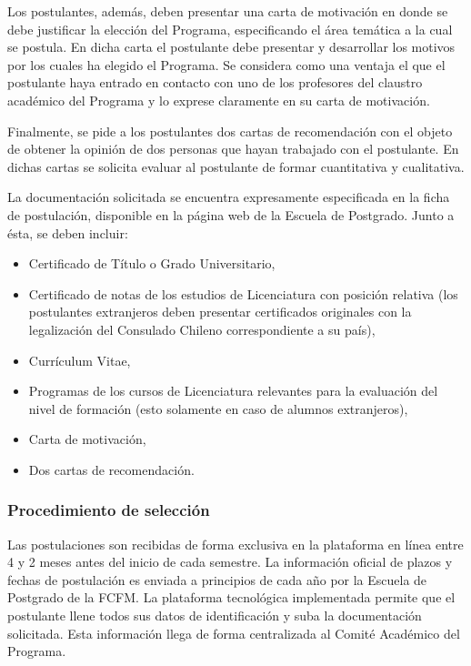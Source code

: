 Los postulantes, además, deben presentar una carta de motivación en donde se debe justificar
la elección del Programa, especificando el área temática a la cual se postula. En dicha carta el
postulante debe presentar y desarrollar los motivos por los cuales ha elegido el Programa. Se
considera como una ventaja el que el postulante haya entrado en contacto con uno de los profesores
del claustro académico del Programa y lo exprese claramente en su carta de motivación.

Finalmente, se pide a los postulantes dos cartas de recomendación con el objeto de obtener la
opinión de dos personas que hayan trabajado con el postulante. En dichas cartas se solicita evaluar
al postulante de formar cuantitativa y cualitativa. %

La documentación solicitada se encuentra expresamente especificada en la ficha de
postulación, disponible en la página web de la Escuela de Postgrado. Junto a ésta, se deben
incluir:

\begin{itemize}
\item Certificado de Título o Grado Universitario,
\item Certificado de notas de los estudios de Licenciatura con posición relativa (los postulantes
extranjeros deben presentar certificados originales con la legalización del Consulado Chileno
correspondiente a su país),
\item Currículum Vitae,
\item Programas de los cursos de Licenciatura relevantes para la evaluación del nivel de formación
(esto solamente en caso de alumnos extranjeros),
\item Carta de motivación,
\item Dos cartas de recomendación. %
\end{itemize}

\subsubsection{Procedimiento de selección}

Las postulaciones son recibidas de forma exclusiva en la plataforma en línea entre 4 y 2
meses antes del inicio de cada semestre. La información oficial de plazos y fechas de postulación
es enviada a principios de cada año por la Escuela de Postgrado de la FCFM. La plataforma
tecnológica implementada permite que el postulante llene todos sus datos de identificación y suba
la documentación solicitada. Esta información llega de forma centralizada al Comité Académico
del Programa. %

